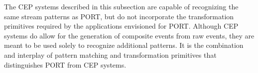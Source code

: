 The CEP systems described in this subsection are capable
of recognizing the same stream patterns as PORT,
but do not incorporate the
transformation primitives
required by the applications
envisioned for PORT. Although CEP systems do allow for the
generation of composite events from raw events,
they are meant
to be used solely to recognize additional patterns.
It is the combination and interplay of pattern matching and transformation
primitives that distinguishes PORT from CEP systems.



